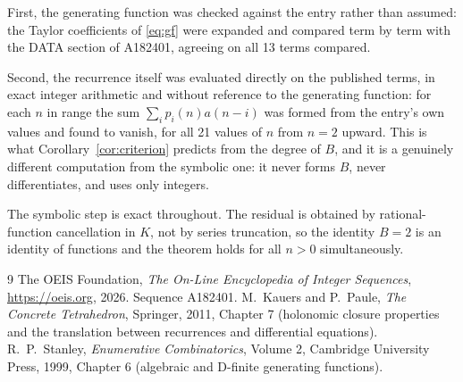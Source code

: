 \documentclass[11pt,a4paper]{article}
\theoremstyle{plain}
\theoremstyle{definition}
\begin{document}
First, the generating function was checked against the entry rather than assumed: the
Taylor coefficients of \eqref{eq:gf} were expanded and compared term by term with the DATA
section of A182401, agreeing on all 13 terms compared.

Second, the recurrence itself was evaluated directly on the published terms, in exact
integer arithmetic and without reference to the generating function: for each $n$ in range
the sum $\sum_{i}p_{i}(n)a(n-i)$ was formed from the entry's own values and found to
vanish, for all 21 values of $n$ from $n=2$ upward. This is what
Corollary~\ref{cor:criterion} predicts from the degree of $B$, and it is a genuinely
different computation from the symbolic one: it never forms $B$, never differentiates, and
uses only integers.

The symbolic step is exact throughout. The residual is obtained by rational-function
cancellation in $K$, not by series truncation, so the identity $B=2$ is an
identity of functions and the theorem holds for all $n>0$ simultaneously.

\begin{thebibliography}{9}
 The OEIS Foundation, \emph{The On-Line Encyclopedia of Integer Sequences},
\url{https://oeis.org}, 2026. Sequence A182401.
 M.~Kauers and P.~Paule, \emph{The Concrete Tetrahedron}, Springer, 2011,
Chapter 7 (holonomic closure properties and the translation between recurrences and
differential equations).
 R.~P.~Stanley, \emph{Enumerative Combinatorics}, Volume 2, Cambridge
University Press, 1999, Chapter 6 (algebraic and D-finite generating functions).
\end{thebibliography}
\end{document}
